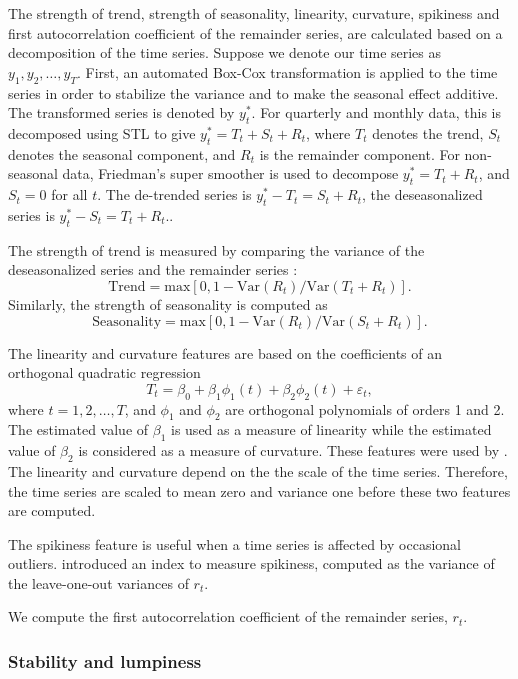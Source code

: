 \documentclass[11pt,a4paper,]{article}
\def\var{\text{Var}}
\begin{document}
The strength of trend, strength of seasonality, linearity, curvature, spikiness and first autocorrelation coefficient of the remainder series, are calculated based on a decomposition of the time series. Suppose we denote our time series as \(y_1, y_2, \dots,y_T\). First, an automated Box-Cox transformation \autocite{Guerrero1993} is applied to the time series in order to stabilize the variance and to make the seasonal effect additive. The transformed series is denoted by \(y_{t}^*\). For quarterly and monthly data, this is decomposed using STL \autocite{cleveland1990stl} to give \(y_t^*=T_t+S_t+R_t\), where \(T_t\) denotes the trend, \(S_t\) denotes the seasonal component, and \(R_t\) is the remainder component. For non-seasonal data, Friedman's super smoother \autocite{supsmu} is used to decompose \(y_t^*=T_t+R_t\), and \(S_t=0\) for all \(t\). The de-trended series is \(y_t^*-T_t=S_t+R_t\), the deseasonalized series is \(y_t^*-S_t = T_t+R_t\)..

The strength of trend is measured by comparing the variance of the deseasonalized series and the remainder series \autocite{wang2009rule}:
\[
    \text{Trend} = \text{max}\left[0, 1 - \var(R_{t})/\var(T_t+R_t)\right].
\]
Similarly, the strength of seasonality is computed as
\[
    \text{Seasonality} = \text{max}\left[0, 1- \var(R_{t})/ \var(S_t+R_t)\right].
\]

The linearity and curvature features are based on the coefficients of an orthogonal quadratic regression
\[
  T_t=\beta_0+\beta_1 \phi_1(t) + \beta_2\phi_2(t) + \varepsilon_t,
\]
where \(t=1, 2, \dots,T\), and \(\phi_1\) and \(\phi_2\) are orthogonal polynomials of orders 1 and 2. The estimated value of \(\beta_1\) is used as a measure of linearity while the estimated value of \(\beta_2\) is considered as a measure of curvature. These features were used by \textcite{hyndman2015large}. The linearity and curvature depend on the the scale of the time series. Therefore, the time series are scaled to mean zero and variance one before these two features are computed.

The spikiness feature is useful when a time series is affected by occasional outliers. \textcite{hyndman2015large} introduced an index to measure spikiness, computed as the variance of the leave-one-out variances of \(r_t\).

We compute the first autocorrelation coefficient of the remainder series, \(r_t\).

\hypertarget{stability-and-lumpiness}{%
\subsubsection*{Stability and lumpiness}\label{stability-and-lumpiness}}
\end{document}

